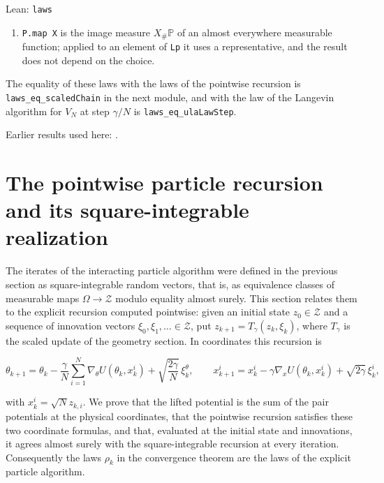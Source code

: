 \documentclass[11pt,a4paper]{report}
\begin{document}
\begin{leanbox}{Lean: \texttt{laws}}
\begin{enumerate}
\item \texttt{P.\allowbreak{}map X} is the image measure \(X_\#\mathbb P\) of an almost everywhere measurable function; applied to an element of \texttt{Lp} it uses a representative, and the result does not depend on the choice.

\end{enumerate}



The equality of these laws with the laws of the pointwise recursion is \texttt{laws\_\allowbreak{}eq\_\allowbreak{}scaled\allowbreak{}Chain} in the next module, and with the law of the Langevin algorithm for \(V_N\) at step \(\gamma/N\) is \texttt{laws\_\allowbreak{}eq\_\allowbreak{}ula\allowbreak{}Law\allowbreak{}Step}.
\end{leanbox}


Earlier results used here: \cite[Section~3.19.1]{LangevinLean2026ULASC}.
\section{\texorpdfstring{The pointwise particle recursion and its square-integrable realization}{The pointwise particle recursion and its square-integrable realization}}
\label{proof-module-IPLA-Dynamics-lean}


The iterates of the interacting particle algorithm were defined in the previous section as square-integrable random vectors, that is, as equivalence classes of measurable maps \(\Omega\to\mathcal Z\) modulo equality almost surely. This section relates them to the explicit recursion computed pointwise: given an initial state \(z_0\in\mathcal Z\) and a sequence of innovation vectors \(\xi_0,\xi_1,\dots\in\mathcal Z\), put \(z_{k+1}=T_\gamma(z_k,\xi_k)\), where \(T_\gamma\) is the scaled update of the geometry section. In coordinates this recursion is


\[\theta_{k+1}=\theta_k-\frac\gamma N\sum_{i=1}^N\nabla_\theta U(\theta_k,x_k^i)+\sqrt{\frac{2\gamma}N}\,\xi_k^\theta,\qquad x_{k+1}^i=x_k^i-\gamma\nabla_xU(\theta_k,x_k^i)+\sqrt{2\gamma}\,\xi_k^i,\]


with \(x_k^i=\sqrt N z_{k,i}\). We prove that the lifted potential is the sum of the pair potentials at the physical coordinates, that the pointwise recursion satisfies these two coordinate formulas, and that, evaluated at the initial state and innovations, it agrees almost surely with the square-integrable recursion at every iteration. Consequently the laws \(\rho_k\) in the convergence theorem are the laws of the explicit particle algorithm.
\end{document}
